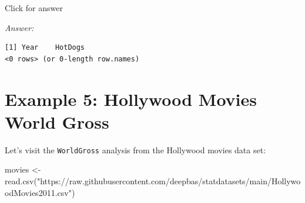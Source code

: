 \documentclass[
]{book}
\newenvironment{Shaded}{\begin{snugshade}}{\end{snugshade}}
\newcommand{\FloatTok}[1]{\textcolor[rgb]{0.00,0.00,0.81}{#1}}
\newcommand{\FunctionTok}[1]{\textcolor[rgb]{0.00,0.00,0.00}{#1}}
\newcommand{\NormalTok}[1]{#1}
\newcommand{\OtherTok}[1]{\textcolor[rgb]{0.56,0.35,0.01}{#1}}
\newcommand{\SpecialCharTok}[1]{\textcolor[rgb]{0.00,0.00,0.00}{#1}}
\newcommand{\StringTok}[1]{\textcolor[rgb]{0.31,0.60,0.02}{#1}}
\begin{document}
Click for answer

\emph{Answer:}

\begin{Shaded}
\end{Shaded}

\begin{verbatim}
[1] Year    HotDogs
<0 rows> (or 0-length row.names)
\end{verbatim}

\hypertarget{example-5-hollywood-movies-world-gross}{%
\section{Example 5: Hollywood Movies World Gross}\label{example-5-hollywood-movies-world-gross}}

Let's visit the \texttt{WorldGross} analysis from the Hollywood movies data set:

\begin{Shaded}
\begin{Highlighting}[]
\NormalTok{movies }\OtherTok{\textless{}{-}} \FunctionTok{read.csv}\NormalTok{(}\StringTok{"https://raw.githubusercontent.com/deepbas/statdatasets/main/HollywoodMovies2011.csv"}\NormalTok{)}
\end{Highlighting}
\end{Shaded}
\end{document}
